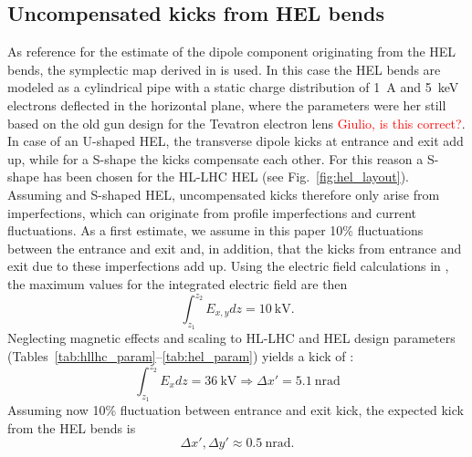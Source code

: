 \documentclass[%
 reprint,
 amsmath,amssymb,
 aps,
prstab,
]{revtex4-1}
\newcommand{\q}[2]{\ensuremath{#1\ \mathrm{#2}}} %
\begin{document}
\subsection{Uncompensated kicks from HEL bends}
\label{core:sec:1}
As reference for the estimate of the dipole component originating from the HEL bends, the symplectic map derived in \cite{hel_bends_stancari} is used. In this case the HEL bends are modeled as a cylindrical pipe with a static charge distribution of 1~A and 5~keV electrons deflected in the horizontal plane, where the parameters were her still based on the old gun design for the Tevatron electron lens \textcolor{red}{Giulio, is this correct?}. In case of an U-shaped HEL, the transverse dipole kicks at entrance and exit add up, while for a S-shape the kicks compensate each other. For this reason a S-shape has been chosen for the HL-LHC HEL (see Fig.~\ref{fig:hel_layout}). Assuming and S-shaped HEL, uncompensated kicks therefore only arise from imperfections, which can originate from profile imperfections and current fluctuations. As a first estimate, we assume in this paper 10\% fluctuations between the entrance and exit and, in addition, that the kicks from entrance and exit due to these imperfections add up. Using the electric field calculations in \cite{hel_bends_stancari}, the maximum values for the integrated electric field are then
\begin{equation}
\int_{z_1}^{z_2} E_{x,y} dz= 10 \ \mathrm{kV}.
\end{equation}
Neglecting magnetic effects and scaling to HL-LHC and HEL design parameters (Tables~\ref{tab:hllhc_param}--\ref{tab:hel_param}) yields a kick of \cite{md_sim_hel_res_ex_fitterer}:
\begin{equation}
\int_{z_1}^{z_2} E_{x} dz= 36 \ \mathrm{kV} \Rightarrow \Delta x'= \q{5.1}{nrad}
\end{equation}
Assuming now 10\% fluctuation between entrance and exit kick, the expected kick from the HEL bends is
\begin{equation}\label{eqn:kick_bends}
\Delta x', \Delta y'\approx \q{0.5}{nrad}.
\end{equation}
\end{document}
